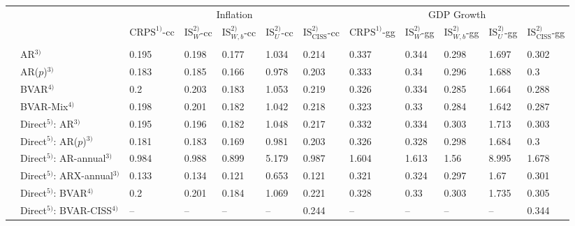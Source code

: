 \begin{table}[!h]
\centering
\begin{tabular}{llllllllllll}
\toprule
\multicolumn{2}{c}{ } & \multicolumn{5}{c}{{Inflation\hspace*{15mm}}} & \multicolumn{5}{c}{{GDP Growth}} \\
\cmidrule(l{3pt}r{3pt}){3-7} \cmidrule(l{3pt}r{3pt}){8-12}
 &  & $\text{CRPS}^{1)}$-cc & $\text{IS}_{W}^{2)}$-cc & $\text{IS}_{W,b}^{2)}$-cc & $\text{IS}_{U}^{2)}$-cc & $\text{IS}_{\text{CISS}}^{2)}$-cc & $\text{CRPS}^{1)}$-gg & $\text{IS}_{W}^{2)}$-gg & $\text{IS}_{W,b}^{2)}$-gg & $\text{IS}_{U}^{2)}$-gg & $\text{IS}_{\text{CISS}}^{2)}$-gg\\
\midrule
\cellcolor{gray!35}{} & \cellcolor{gray!35}{IMF} & \cellcolor{gray!35}{\textbf{0.103}} & \cellcolor{gray!35}{\textbf{0.106}} & \cellcolor{gray!35}{\textbf{0.093}} & \cellcolor{gray!35}{\textbf{0.522}} & \cellcolor{gray!35}{\textbf{0.089}} & \cellcolor{gray!35}{0.292} & \cellcolor{gray!35}{0.298} & \cellcolor{gray!35}{0.269} & \cellcolor{gray!35}{1.561} & \cellcolor{gray!35}{0.255}\\
\parbox[t]{2mm}{}
 & AR$^{3)}$ & 0.195 & 0.198 & 0.177 & 1.034 & 0.214 & 0.337 & 0.344 & 0.298 & 1.697 & 0.302\\
 & AR($p$)$^{3)}$ & 0.183 & 0.185 & 0.166 & 0.978 & 0.203 & 0.333 & 0.34 & 0.296 & 1.688 & 0.3\\
 & BVAR$^{4)}$ & 0.2 & 0.203 & 0.183 & 1.053 & 0.219 & 0.326 & 0.334 & 0.285 & 1.664 & 0.288\\
 & BVAR-Mix$^{4)}$ & 0.198 & 0.201 & 0.182 & 1.042 & 0.218 & 0.323 & 0.33 & 0.284 & 1.642 & 0.287\\
 & Direct$^{5)}$: AR$^{3)}$ & 0.195 & 0.196 & 0.182 & 1.048 & 0.217 & 0.332 & 0.334 & 0.303 & 1.713 & 0.303\\
 & Direct$^{5)}$: AR($p$)$^{3)}$ & 0.181 & 0.183 & 0.169 & 0.981 & 0.203 & 0.326 & 0.328 & 0.298 & 1.684 & 0.3\\
 & Direct$^{5)}$: AR-annual$^{3)}$ & 0.984 & 0.988 & 0.899 & 5.179 & 0.987 & 1.604 & 1.613 & 1.56 & 8.995 & 1.678\\
 & Direct$^{5)}$: ARX-annual$^{3)}$ & 0.133 & 0.134 & 0.121 & 0.653 & 0.121 & 0.321 & 0.324 & 0.297 & 1.67 & 0.301\\
 & Direct$^{5)}$: BVAR$^{4)}$ & 0.2 & 0.201 & 0.184 & 1.069 & 0.221 & 0.328 & 0.33 & 0.303 & 1.735 & 0.305\\
 & Direct$^{5)}$: BVAR-CISS$^{4)}$ & -- & -- & -- & -- & 0.244 & -- & -- & -- & -- & 0.344\\

\end{tabular}
\end{table}
